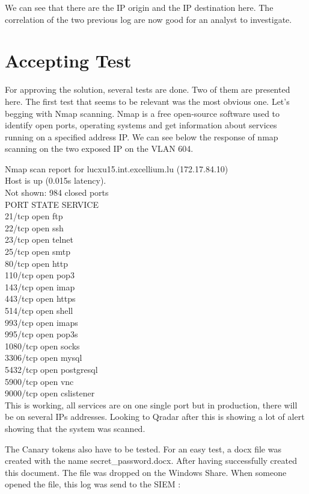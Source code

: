 \documentclass{tnreport}
\begin{document}
We can see that there are the IP origin and the IP destination here. The correlation of the two previous log are now good for an analyst to investigate.

\section{Accepting Test}
For approving the solution, several tests are done. Two of them are presented here.
The first test that seems to be relevant was the most obvious one.
Let's begging with Nmap scanning. Nmap is a free open-source software used to identify open ports, operating systems and get information about services running on a specified address IP.
We can see below the response of nmap scanning on the two exposed IP on the VLAN 604.

Nmap scan report for lucxu15.int.excellium.lu (172.17.84.10)\\
Host is up (0.015s latency).\\
Not shown: 984 closed ports\\
PORT     STATE SERVICE\\
21/tcp   open  ftp\\
22/tcp   open  ssh\\
23/tcp   open  telnet\\
25/tcp   open  smtp\\
80/tcp   open  http\\
110/tcp  open  pop3\\
143/tcp  open  imap\\
443/tcp  open  https\\
514/tcp  open  shell\\
993/tcp  open  imaps\\
995/tcp  open  pop3s\\
1080/tcp open  socks\\
3306/tcp open  mysql\\
5432/tcp open  postgresql\\
5900/tcp open  vnc\\
9000/tcp open  cslistener\\

This is working, all services are on one single port but in production, there will be on several IPs addresses. Looking to Qradar after this is showing a lot of alert showing that the system was scanned.

The Canary tokens also have to be tested. For an easy test, a docx file was created with the name secret\_password.docx. After having successfully created this document. The file was dropped on the Windows Share. When someone opened the file, this log was send to the SIEM :
\end{document}
